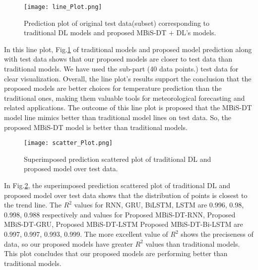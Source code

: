 \begin{figure}[!h]
\centering
\texttt{[image: line\_Plot.png]}
\caption{Prediction plot of original test data(subset) corresponding to traditional DL models and proposed MBiS-DT $+$ DL's models.}
\label{fig:Line plot of vs proposed MBiS-DT models}
\end{figure}

In this line plot, Fig.\ref{fig:Line plot of vs proposed MBiS-DT models} of traditional models and proposed model prediction along with test data shows that our proposed models are closer to test data than traditional models. We have used the sub-part (40 data points.) test data for clear visualization. Overall, the line plot's results support the conclusion that the proposed models are better choices for temperature prediction than the traditional ones, making them valuable tools for meteorological forecasting and related applications. The outcome of this line plot is proposed that the MBiS-DT model line mimics better than traditional model lines on test data. So, the proposed MBiS-DT model is better than traditional models.

\begin{figure}[!h]
\centering
\texttt{[image: scatter\_Plot.png]}
\caption{Superimposed prediction scattered plot of traditional DL and proposed model over test data.}
\label{fig:Scatter plot of vs proposed MBiS-DT models}
\end{figure}



In Fig.\ref{fig:Scatter plot of vs proposed MBiS-DT models}, the superimposed prediction scattered plot of traditional DL and proposed model over test data shows that the distribution of points is closest to the trend line. The $R^2$ values for RNN, GRU, BiLSTM, LSTM are 0.996, 0.98, 0.998, 0.988 respectively and values for Proposed MBiS-DT-RNN, Proposed MBiS-DT-GRU, Proposed MBiS-DT-LSTM Proposed MBiS-DT-Bi-LSTM are 0.997, 0.997, 0.993, 0.999. The more excellent value of $R^2$ shows the preciseness of data, so our proposed models have greater $R^2$ values than traditional models. This plot concludes that our proposed models are performing better than traditional models.



